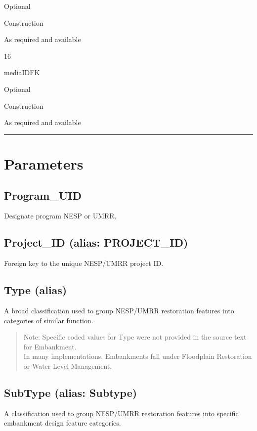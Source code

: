\documentclass[
  letterpaper,
  DIV=11,
  numbers=noendperiod]{scrreprt}
\begin{document}
Optional

Construction

As required and available

16

mediaIDFK

Optional

Construction

As required and available

\begin{center}\rule{0.5\linewidth}{0.5pt}\end{center}

\section{Parameters}\label{parameters-1}

\subsection{Program\_UID}\label{program_uid-1}

Designate program NESP or UMRR.

\subsection{Project\_ID (alias:
PROJECT\_ID)}\label{project_id-alias-project_id-1}

Foreign key to the unique NESP/UMRR project ID.

\subsection{Type (alias)}\label{type-alias-1}

A broad classification used to group NESP/UMRR restoration features into
categories of similar function.

\begin{quote}
Note: Specific coded values for Type were not provided in the source
text for Embankment.\\
In many implementations, Embankments fall under Floodplain Restoration
or Water Level Management.
\end{quote}

\subsection{SubType (alias: Subtype)}\label{subtype-alias-subtype-1}

A classification used to group NESP/UMRR restoration features into
specific embankment design feature categories.
\end{document}
